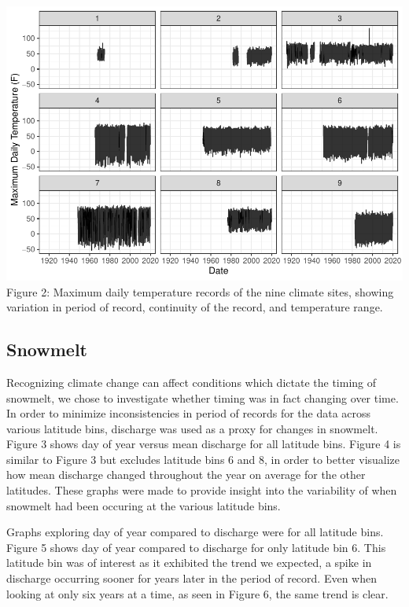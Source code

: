 \documentclass[12pt,]{article}
\begin{document}
\includegraphics{Project_Report_v2_files/figure-latex/Exploratory Temperature Figure-1.pdf}
Figure 2: Maximum daily temperature records of the nine climate sites,
showing variation in period of record, continuity of the record, and
temperature range.

\newpage

\hypertarget{snowmelt}{%
\subsection{Snowmelt}\label{snowmelt}}

Recognizing climate change can affect conditions which dictate the
timing of snowmelt, we chose to investigate whether timing was in fact
changing over time. In order to minimize inconsistencies in period of
records for the data across various latitude bins, discharge was used as
a proxy for changes in snowmelt. Figure 3 shows day of year versus mean
discharge for all latitude bins. Figure 4 is similar to Figure 3 but
excludes latitude bins 6 and 8, in order to better visualize how mean
discharge changed throughout the year on average for the other
latitudes. These graphs were made to provide insight into the
variability of when snowmelt had been occuring at the various latitude
bins.

Graphs exploring day of year compared to discharge were for all latitude
bins. Figure 5 shows day of year compared to discharge for only latitude
bin 6. This latitude bin was of interest as it exhibited the trend we
expected, a spike in discharge occurring sooner for years later in the
period of record. Even when looking at only six years at a time, as seen
in Figure 6, the same trend is clear.
\end{document}
